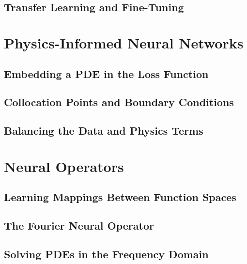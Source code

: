 \subsection{Transfer Learning and Fine-Tuning}

\section{Physics-Informed Neural Networks}
\label{sec:pinn}

\subsection{Embedding a PDE in the Loss Function}


\subsection{Collocation Points and Boundary Conditions}

\subsection{Balancing the Data and Physics Terms}

\section{Neural Operators}
\label{sec:neural-operators}

\subsection{Learning Mappings Between Function Spaces}

\subsection{The Fourier Neural Operator}

\subsection{Solving PDEs in the Frequency Domain}
